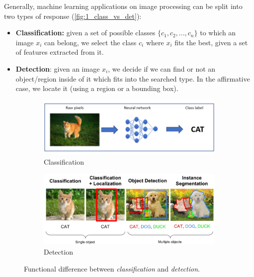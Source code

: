 Generally, machine learning applications on image processing can be split into two types of response (\autoref{fig:1_class_vs_det}):

\begin{itemize}
	\item \textbf{Classification:} given a set of possible classes $\{c_1, c_2, ..., c_n\}$ to which an image $x_i$ can belong, we select the class $c_i$ where $x_i$ fits the best, given a set of features extracted from it.
	\item \textbf{Detection}: given an image $x_i$, we decide if we can find or not an object/region inside of it which fits into the searched type. In the affirmative case, we locate it (using a region or a bounding box).
\end{itemize}

\begin{figure}[h!]
	\centering
	\begin{subfigure}[h!]{0.7\textwidth}
		\includegraphics[width=\textwidth]{images/classification}
		\caption{Classification}
		\label{fig:1_classification}
	\end{subfigure}
	
	\qquad
	
	\begin{subfigure}[h!]{0.7\textwidth}
		\includegraphics[width=\textwidth]{images/detection}
		\caption{Detection}
		\label{fig:1_detection}			
	\end{subfigure}
	
	\caption{Functional difference between \textit{classification} and \textit{detection}.}
	\label{fig:1_class_vs_det}
\end{figure}


